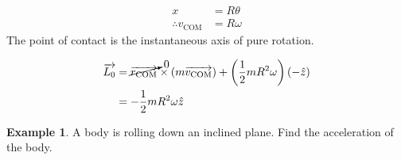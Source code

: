 \documentclass[fleqn, a4paper, 12pt]{article}
\theoremstyle{definition}
\newtheorem{example}{Example}
\theoremstyle{theorem}
\begin{document}

\begin{align*}
	x &= R \theta\\
	\therefore v_{\text{COM}} &= R \omega
\end{align*}
The point of contact is the instantaneous axis of pure rotation.

\begin{align*}
	\overrightarrow{L_0} &= \cancelto{0}{\overrightarrow{r_{\text{COM}}}} \times (m \overrightarrow{v_{\text{COM}}}) + \left( \dfrac{1}{2} m R^2 \omega \right) (-\hat{z})\\
	&= -\dfrac{1}{2} m R^2 \omega \hat{z}
\end{align*}

\begin{example}
	A body is rolling down an inclined plane. Find the acceleration of the body.
\end{example}
\end{document}
